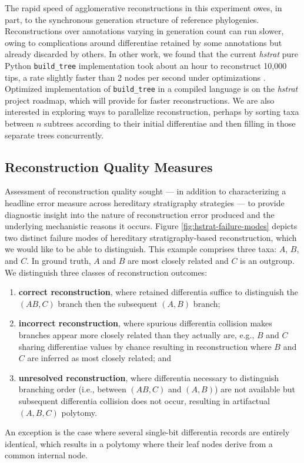 The rapid speed of agglomerative reconstructions in this experiment owes, in part, to the synchronous generation structure of reference phylogenies.
Reconstructions over annotations varying in generation count can run slower, owing to complications around differentiae retained by some annotations but already discarded by others.
In other work, we found that the current \textit{hstrat} pure Python \texttt{build\_tree} implementation took about an hour to reconstruct 10,000 tips, a rate slightly faster than 2 nodes per second under optimizations \citep{moreno2024trackable}.
Optimized implementation of \texttt{build\_tree} in a compiled language is on the \textit{hstrat} project roadmap, which will provide for faster reconstructions.
We are also interested in exploring ways to parallelize reconstruction, perhaps by sorting taxa between $n$ subtrees according to their initial differentiae and then filling in those separate trees concurrently.

\subsection{Reconstruction Quality Measures}



Assessment of reconstruction quality sought --- in addition to characterizing a headline error measure across hereditary stratigraphy strategies --- to provide diagnostic insight into the nature of reconstruction error produced and the underlying mechanistic reasons it occurs.
Figure \ref{fig:hstrat-failure-modes} depicts two distinct failure modes of hereditary stratigraphy-based reconstruction, which we would like to be able to distinguish.
This example comprises three taxa: $A$, $B$, and $C$.
In ground truth, $A$ and $B$ are most closely related and $C$ is an outgroup.
We distinguish three classes of reconstruction outcomes:
\begin{enumerate}
\item \textbf{correct reconstruction}, where retained differentia suffice to distinguish the $(AB,C)$ branch then the subsequent $(A,B)$ branch;
\item \textbf{incorrect reconstruction}, where spurious differentia collision makes branches appear more closely related than they actually are, e.g., $B$ and $C$ sharing differentiae values by chance resulting in reconstruction where $B$ and $C$ are inferred as most closely related; and
\item \textbf{unresolved reconstruction}, where differentia necessary to distinguish branching order (i.e., between $(AB,C)$ and $(A,B)$) are not available but subsequent differentia collision does not occur, resulting in artifactual $(A,B,C)$ polytomy.
\end{enumerate}
An exception is the case where several single-bit differentia records are entirely identical, which results in a polytomy where their leaf nodes derive from a common internal node.

